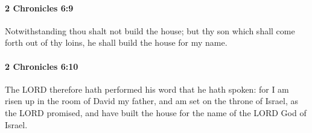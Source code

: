 		\paragraph{2 Chronicles 6:9} %
			\label{2CHRONICLES-6-9}

			Notwithstanding thou shalt not build the house; but thy son which shall come forth out of thy loins, he shall build the house for my name.


		\paragraph{2 Chronicles 6:10} %
			\label{2CHRONICLES-6-10}

			The LORD therefore hath performed his word that he hath spoken: for I am risen up in the room of David my father, and am set on the throne of Israel, as the LORD promised, and have built the house for the name of the LORD God of Israel.

